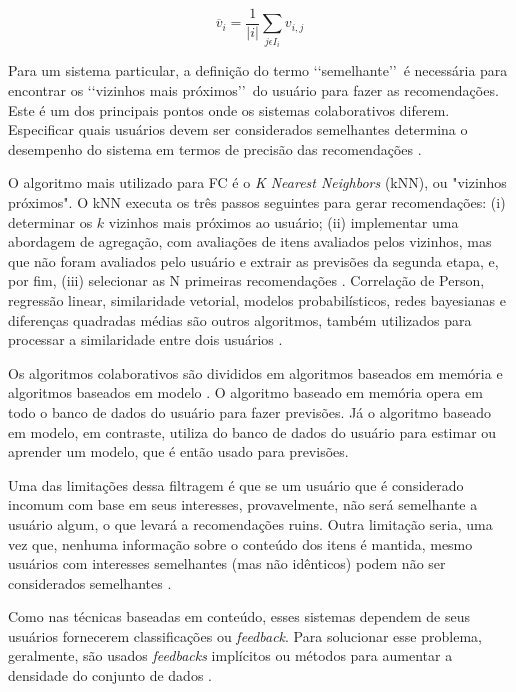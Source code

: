 \begin{equation}
	\label{eqn02}
\overline{v}_{i} = \frac{1}{\left | i \right |} \sum_{j\epsilon I_{i}}^{} v_{i,j}
\end{equation}


Para um sistema particular, a definição do termo \lq\lq semelhante\rq\rq\ é necessária para encontrar 
os \lq\lq vizinhos mais próximos\rq\rq\ do usuário para fazer as recomendações. Este é um dos principais 
pontos onde os sistemas colaborativos diferem. Especificar quais usuários devem ser considerados semelhantes determina o
desempenho do sistema em termos de precisão das recomendações \cite{son2017}.

O algoritmo mais utilizado para FC é o \emph{K Nearest Neighbors} (kNN), ou "vizinhos próximos". O kNN executa 
os três passos seguintes para gerar recomendações: (i) determinar os $k$ vizinhos mais próximos ao usuário; (ii) implementar 
uma abordagem de agregação, com avaliações de itens avaliados pelos vizinhos, mas que não foram avaliados pelo usuário e 
extrair as previsões da segunda etapa, e, por fim, (iii) selecionar as N primeiras recomendações \cite{bobadilla2013}. Correlação de Person, regressão linear, 
similaridade vetorial, modelos probabilísticos, redes bayesianas e diferenças quadradas médias são outros algoritmos, também utilizados para processar a similaridade entre dois usuários \cite{paulson2003}.

Os algoritmos colaborativos são divididos em algoritmos baseados em memória e algoritmos baseados em 
modelo \cite{breese2013}. O algoritmo baseado em memória opera em todo o banco de dados do usuário para fazer 
previsões. Já o algoritmo baseado em modelo, em contraste, utiliza do banco de dados do usuário 
para estimar ou aprender um modelo, que é então usado para previsões.

Uma das limitações dessa filtragem é que se um usuário que é considerado incomum com base em seus 
interesses, provavelmente, não será semelhante a usuário algum,
o que levará a recomendações ruins. Outra limitação seria, uma vez que, nenhuma informação sobre o 
conteúdo dos itens é mantida, mesmo usuários com interesses semelhantes (mas não 
idênticos) podem não ser considerados semelhantes \cite{son2017}.

Como nas técnicas baseadas em conteúdo, esses sistemas dependem de seus usuários fornecerem classificações ou \emph{feedback}. Para solucionar 
esse problema, geralmente, são usados \emph{feedbacks} implícitos ou métodos para aumentar 
a densidade do conjunto de dados \cite{paulson2003}.

